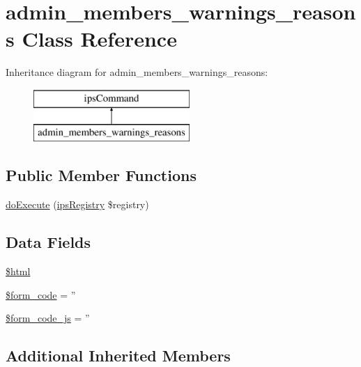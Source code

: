 \hypertarget{classadmin__members__warnings__reasons}{\section{admin\-\_\-members\-\_\-warnings\-\_\-reasons Class Reference}
\label{classadmin__members__warnings__reasons}
}
Inheritance diagram for admin\-\_\-members\-\_\-warnings\-\_\-reasons\-:\begin{figure}[H]
\begin{center}
\leavevmode
\includegraphics[height=2.000000cm]{classadmin__members__warnings__reasons}
\end{center}
\end{figure}
\subsection*{Public Member Functions}
\begin{DoxyCompactItemize}
\item 
\hyperlink{classadmin__members__warnings__reasons_afbc4e912a0604b94d47d66744c64d8ba}{do\-Execute} (\hyperlink{classips_registry}{ips\-Registry} \$registry)
\end{DoxyCompactItemize}
\subsection*{Data Fields}
\begin{DoxyCompactItemize}
\item 
\hyperlink{classadmin__members__warnings__reasons_a6f96e7fc92441776c9d1cd3386663b40}{\$html}
\item 
\hyperlink{classadmin__members__warnings__reasons_af28aee726fa3eb6c355d08a2ab655e03}{\$form\-\_\-code} = ''
\item 
\hyperlink{classadmin__members__warnings__reasons_ac68fe8a02a2efd63c3271179f4b4fbb7}{\$form\-\_\-code\-\_\-js} = ''
\end{DoxyCompactItemize}
\subsection*{Additional Inherited Members}


